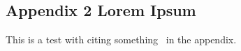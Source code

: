 
%

\begin{newpdflayout}{210mm}{297mm}%

\chapter{Appendix 2 Lorem Ipsum}
\label{app:lorem_ipsum2}

This is a test with citing something~\cite{ecoop12-dias} in the appendix.

\lipsum[1-10]

\end{newpdflayout}

\lipsum[1-10]
